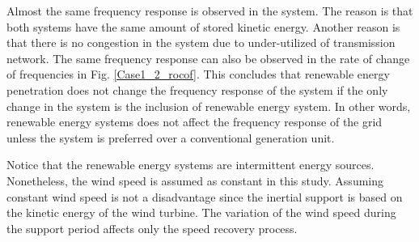 Almost the same frequency response is observed in the system. The reason is that both systems have the same amount of stored kinetic energy. Another reason is that there is no congestion in the system due to under-utilized of transmission network. The same frequency response can also be observed in the rate of change of frequencies in Fig. \ref{Case1_2_rocof}. This concludes that renewable energy penetration does not change the frequency response of the system if the only change in the system is the inclusion of renewable energy system. In other words, renewable energy systems does not affect the frequency response of the grid unless the system is preferred over a conventional generation unit. \par
Notice that the renewable energy systems are intermittent energy sources. Nonetheless, the wind speed is assumed as constant in this study. Assuming constant wind speed is not a disadvantage since the inertial support is based on the kinetic energy of the wind turbine. The variation of the wind speed during the support period affects only the speed recovery process. 
